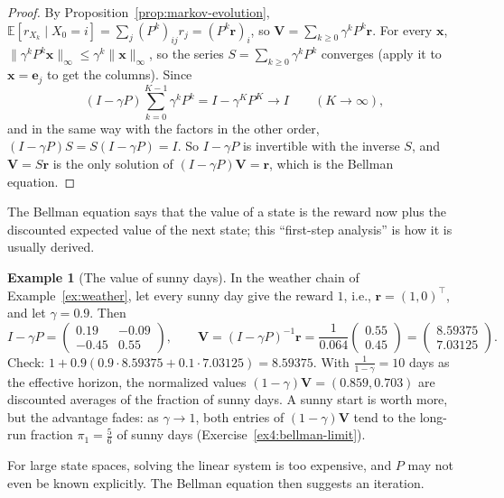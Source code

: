 \documentclass[11pt]{article}
\newcommand{\norm}[1]{\lVert #1 \rVert}
\newcommand{\E}{\mathbb{E}}
\theoremstyle{definition}
\newtheorem{example}[definition]{Example}
\theoremstyle{plain}
\theoremstyle{remark}
\begin{document}
\begin{proof}
    By Proposition~\ref{prop:markov-evolution}, $\E[r_{X_k} \mid X_0 = i] = \sum_j (P^k)_{ij}r_j = (P^k\mathbf{r})_i$, so $\mathbf{V} = \sum_{k \geq 0}\gamma^kP^k\mathbf{r}$. For every $\mathbf{x}$, $\norm{\gamma^kP^k\mathbf{x}}_\infty \leq \gamma^k\norm{\mathbf{x}}_\infty$, so the series $S = \sum_{k \geq 0}\gamma^kP^k$ converges (apply it to $\mathbf{x} = \mathbf{e}_j$ to get the columns). Since
    \[(I - \gamma P)\sum_{k=0}^{K-1}\gamma^kP^k = I - \gamma^KP^K \to I \qquad (K \to \infty),\]
    and in the same way with the factors in the other order, $(I - \gamma P)S = S(I - \gamma P) = I$. So $I - \gamma P$ is invertible with the inverse $S$, and $\mathbf{V} = S\mathbf{r}$ is the only solution of $(I - \gamma P)\mathbf{V} = \mathbf{r}$, which is the Bellman equation.
\end{proof}

The Bellman equation says that the value of a state is the reward now plus the discounted expected value of the next state; this ``first-step analysis'' is how it is usually derived.

\begin{example}[The value of sunny days]\label{ex:bellman-weather}
    In the weather chain of Example~\ref{ex:weather}, let every sunny day give the reward $1$, i.e., $\mathbf{r} = (1, 0)^\top$, and let $\gamma = 0.9$. Then
    \[I - \gamma P = \begin{pmatrix} 0.19 & -0.09 \\ -0.45 & 0.55 \end{pmatrix}, \qquad \mathbf{V} = (I - \gamma P)^{-1}\mathbf{r} = \frac{1}{0.064}\begin{pmatrix} 0.55 \\ 0.45 \end{pmatrix} = \begin{pmatrix} 8.59375 \\ 7.03125 \end{pmatrix}.\]
    Check: $1 + 0.9(0.9 \cdot 8.59375 + 0.1 \cdot 7.03125) = 8.59375$. With $\frac{1}{1 - \gamma} = 10$ days as the effective horizon, the normalized values $(1 - \gamma)\mathbf{V} = (0.859, 0.703)$ are discounted averages of the fraction of sunny days. A sunny start is worth more, but the advantage fades: as $\gamma \to 1$, both entries of $(1 - \gamma)\mathbf{V}$ tend to the long-run fraction $\pi_1 = \frac{5}{6}$ of sunny days (Exercise~\ref{ex4:bellman-limit}).
\end{example}

For large state spaces, solving the linear system is too expensive, and $P$ may not even be known explicitly. The Bellman equation then suggests an iteration.
\end{document}
